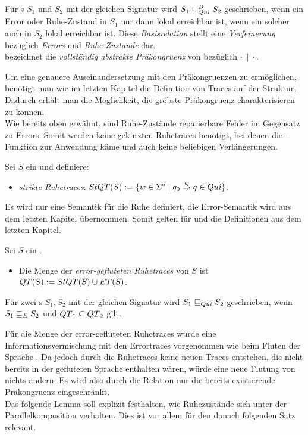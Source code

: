 \begin{Def}
  \label{DefQuiBasisrel}
  Für \EIO{}s $S_1$ und $S_2$ mit der gleichen Signatur wird
  $S_1\sqsubseteq _{Qui}^B S_2$ geschrieben, wenn ein Error oder Ruhe-Zustand in $S_1$ nur
  dann lokal erreichbar ist, wenn ein solcher auch in $S_2$ lokal erreichbar
  ist. Diese \emph{Basisrelation} stellt eine \emph{Verfeinerung} bezüglich
  \emph{Errors} und \emph{Ruhe-Zustände} dar.\\
  \QCRel{} bezeichnet die \emph{vollständig abstrakte Präkongruenz} von
  \QBRel{} bezüglich $\cdot\|\cdot$.
\end{Def}

Um eine genauere Auseinandersetzung mit den Präkongruenzen zu ermöglichen,
benötigt man wie im letzten Kapitel die Definition von Traces auf der Struktur.
Dadurch erhält man die Möglichkeit, die gröbste Präkongruenz charakterisieren zu
können.\\
Wie bereits oben erwähnt, sind Ruhe-Zustände reparierbare Fehler im Gegensatz
zu Errors. Somit werden keine gekürzten Ruhetraces benötigt, bei denen die
\prune{}-Funktion zur Anwendung käme und auch keine beliebigen Verlängerungen.

\begin{Def}[Ruhetraces]
  \label{DefRuhetraces}
  Sei $S$ ein \EIO{} und definiere:
  \begin{itemize}
    \item \emph{strikte Ruhetraces}: $StQT{}(S) := \{w\in\Sigma ^*\mid q_0
      \overset{w}{\Rightarrow} q\in Qui\}$.
  \end{itemize}
\end{Def}

Es wird nur eine Semantik für die Ruhe definiert, die Error-Semantik wird aus
dem letzten Kapitel übernommen. Somit gelten für \ET{} und \EL{} die
Definitionen aus dem letzten Kapitel.

\begin{Def}
  \label{DefQTQL}
  Sei $S$ ein \EIO{}.
  \begin{itemize}
    \item Die Menge der \emph{error-gefluteten Ruhetraces} von $S$ ist
      $QT{}(S) := StQT{}(S)\cup ET{}(S)$.
  \end{itemize}
  Für zwei \EIO{}s $S_1, S_2$ mit der gleichen Signatur wird
  $S_1\sqsubseteq _{Qui} S_2$ geschrieben, wenn $S_1\sqsubseteq _E S_2$ und $QT{}_1\subseteq
  QT{}_2$ gilt.
\end{Def}

Für die Menge der error-gefluteten Ruhetraces \QT{} wurde eine Informationsvermischung
mit den Errortraces vorgenommen wie beim Fluten der Sprache \EL{}. Da jedoch
durch die Ruhetraces keine neuen Traces entstehen, die nicht bereits in der
gefluteten Sprache \EL{} enthalten wären, würde eine neue Flutung von \EL{}
nichts ändern. Es wird also durch die Relation \QRel{} nur die
bereits existierende Präkongruenz \ERel{} eingeschränkt.\\
Das folgende Lemma soll explizit festhalten, wie Ruhezustände sich unter der
Parallelkomposition verhalten. Dies ist vor allem für den danach folgenden Satz
relevant.

